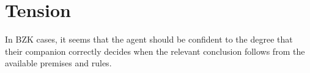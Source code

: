 \documentclass[10pt]{article}
\begin{document}
\section{Tension}
\label{sec:tension}

In BZK cases, it seems that the agent should be confident to the degree that their companion correctly decides when the relevant conclusion follows from the available premises and rules.








\end{document}
